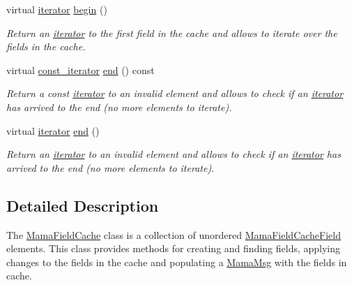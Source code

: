 \begin{DoxyCompactItemize}
virtual \hyperlink{classWombat_1_1MamaFieldCache_1_1iterator}{iterator} \hyperlink{classWombat_1_1MamaFieldCache_af7558308169df0c0aad30ffa49e5a1d3}{begin} ()
\begin{DoxyCompactList}\small\item\em Return an \hyperlink{classWombat_1_1MamaFieldCache_1_1iterator}{iterator} to the first field in the cache and allows to iterate over the fields in the cache. \item\end{DoxyCompactList}\item 
virtual \hyperlink{classWombat_1_1MamaFieldCache_1_1const__iterator}{const\_\-iterator} \hyperlink{classWombat_1_1MamaFieldCache_ac8c46dd5aa1bb2f7142611e9dca17351}{end} () const 
\begin{DoxyCompactList}\small\item\em Return a const \hyperlink{classWombat_1_1MamaFieldCache_1_1iterator}{iterator} to an invalid element and allows to check if an \hyperlink{classWombat_1_1MamaFieldCache_1_1iterator}{iterator} has arrived to the end (no more elements to iterate). \item\end{DoxyCompactList}\item 
virtual \hyperlink{classWombat_1_1MamaFieldCache_1_1iterator}{iterator} \hyperlink{classWombat_1_1MamaFieldCache_a7859324cb8d4b573b4a9ef31685f1a7f}{end} ()
\begin{DoxyCompactList}\small\item\em Return an \hyperlink{classWombat_1_1MamaFieldCache_1_1iterator}{iterator} to an invalid element and allows to check if an \hyperlink{classWombat_1_1MamaFieldCache_1_1iterator}{iterator} has arrived to the end (no more elements to iterate). \item\end{DoxyCompactList}\end{DoxyCompactItemize}


\subsection{Detailed Description}
The {\ttfamily \hyperlink{classWombat_1_1MamaFieldCache}{MamaFieldCache}} class is a collection of unordered {\ttfamily \hyperlink{classWombat_1_1MamaFieldCacheField}{MamaFieldCacheField}} elements. This class provides methods for creating and finding fields, applying changes to the fields in the cache and populating a \hyperlink{classWombat_1_1MamaMsg}{MamaMsg} with the fields in cache. 

